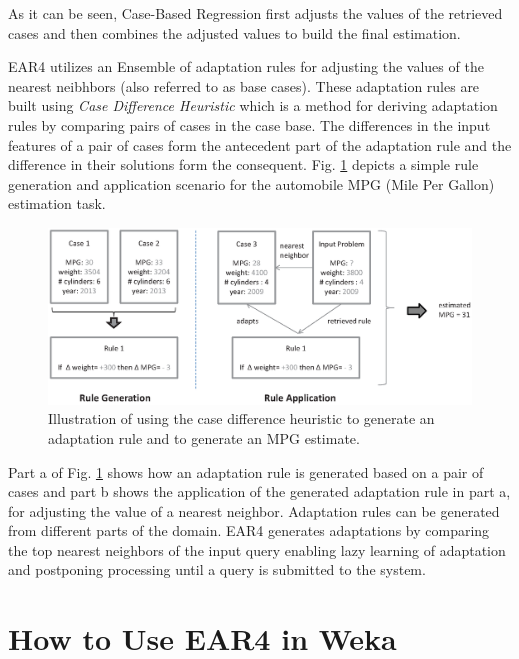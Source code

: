 \documentclass[a4paper]{article}
\begin{document}
As it can be seen, Case-Based Regression first adjusts the values of the retrieved cases and 
then combines the adjusted values to build the final estimation.

EAR4 utilizes an Ensemble of adaptation rules for adjusting the values of the nearest
neibhbors (also referred to as base cases). These adaptation rules are built using 
{\it Case Difference Heuristic} \cite{hanney-keane97} which is a method for deriving adaptation rules by 
comparing pairs of cases in the case base. The differences in the input features of a pair of 
cases form the antecedent part of the adaptation rule and the difference in their solutions form 
the consequent. Fig. \ref{fig:diffs} depicts a simple rule generation and application scenario
for the automobile MPG (Mile Per Gallon) estimation task.

\begin{figure}[htb]
  \begin{center}
  \includegraphics[scale=0.5]{figures/Diffs.eps}
  \caption{Illustration of using the case difference heuristic to
    generate an adaptation rule and to generate an MPG
    estimate.}
  \label{fig:diffs}
  \end{center}
\end{figure}

Part a of Fig. \ref{fig:diffs} shows how an adaptation rule is generated based on a pair of cases 
and part b shows the application of the generated adaptation rule in part a, for adjusting
the value of a nearest neighbor. Adaptation rules can be generated from different parts of the domain. 
EAR4 generates adaptations by comparing the top
nearest neighbors of the input query enabling lazy learning of adaptation and postponing
processing until a query is submitted to the system.


\section{How to Use EAR4 in Weka}
\end{document}
